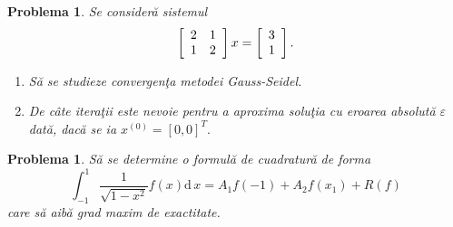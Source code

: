 \documentclass{article}%
\newtheorem{problem}[theorem]{Problema}
\begin{document}
\begin{problem}
Se consider\u{a} sistemul%
\[
\left[
\begin{array}
[c]{cc}%
2 & 1\\
1 & 2
\end{array}
\right]  x=\left[
\begin{array}
[c]{c}%
3\\
1
\end{array}
\right]  .
\]


\begin{enumerate}
\item S\u{a} se studieze convergen\c{t}a metodei Gauss-Seidel.

\item De c\^{a}te itera\c{t}ii este nevoie pentru a aproxima solu\c{t}ia cu
eroarea absolut\u{a} $\varepsilon$ dat\u{a}, dac\u{a} se ia $x^{(0)}%
=[0,0]^{T}.$
\end{enumerate}
\end{problem}

\begin{problem}
S\u{a} se determine o formul\u{a} de cuadratur\u{a} de forma
\[
\int_{-1}^{1}\frac{1}{\sqrt{1-x^{2}}}f(x)\mathrm{d}\,x=A_{1}f(-1)+A_{2}%
f(x_{1})+R(f)
\]
care s\u{a} aib\u{a} grad maxim de exactitate.
\end{problem}
\end{document}
